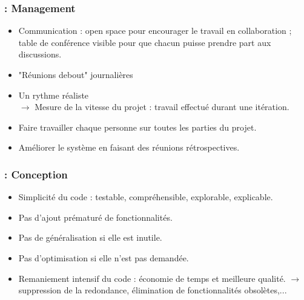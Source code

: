 \begin{frame}
\frametitle{\insertsubsection : Management}
\begin{itemize}
\item Communication : open space pour encourager le travail en collaboration ; table de conférence visible pour que chacun puisse prendre part aux discussions.

\item "Réunions debout" journalières\\ 

\item Un rythme réaliste \\
$\longrightarrow$ Mesure de la vitesse du projet : travail effectué durant une itération.

\item Faire travailler chaque personne sur toutes les parties du projet.

\item Améliorer le système en faisant des réunions rétrospectives.

\end{itemize}

\end{frame}

\begin{frame}
\frametitle{\insertsubsection : Conception}
\begin{itemize}
\item Simplicité du code : testable, compréhensible, explorable, explicable.
\item Pas d'ajout prématuré de fonctionnalités.
\item Pas de généralisation si elle est inutile.
\item Pas d'optimisation si elle n'est pas demandée.
\item Remaniement intensif du code : économie de temps et meilleure qualité. $\rightarrow$ suppression de la redondance, élimination de fonctionnalités obsolètes,...
\end{itemize}
\end{frame}

